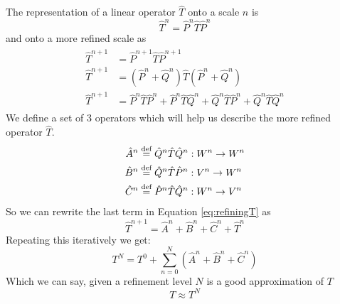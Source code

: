 \documentclass[../master_thesis.tex]{subfiles}
\begin{document}
The representation of a linear operator $\hat{T}$ onto a scale $n$ is
\begin{equation}\label{eq:PTP}
  \hat{T}^n = \hat{P}^n\hat{T}\hat{P}^n
\end{equation}
and onto a more refined scale as
\begin{align}\label{eq:refiningT}
  \begin{split}
    \hat{T}^{n+1} &= \hat{P}^{n+1}\hat{T}\hat{P}^{n+1}\\
    \hat{T}^{n+1} &= (\hat{P}^n + \hat{Q}^n)\hat{T}(\hat{P}^n + \hat{Q}^n)\\
    \hat{T}^{n+1} &= \hat{P}^n\hat{T}\hat{P}^n + \hat{P}^n\hat{T}\hat{Q}^n + \hat{Q}^n\hat{T}\hat{P}^n + \hat{Q}^n\hat{T}\hat{Q}^n
  \end{split}
\end{align}
We define a set of 3 operators which will help us describe the more refined operator
$\hat{T}$.
\begin{align}
  \hat{A}^n & \stackrel{\text{def}}{=}\hat{Q}^n\hat{T}\hat{Q}^n: W^n \to W^n\\
  \hat{B}^n & \stackrel{\text{def}}{=}\hat{Q}^n\hat{T}\hat{P}^n: V^n \to W^n\\
  \hat{C}^n & \stackrel{\text{def}}{=}\hat{P}^n\hat{T}\hat{Q}^n: W^n \to V^n
\end{align}
So we can rewrite the last term in Equation \ref{eq:refiningT} as
\begin{equation}\label{eq:refineT}
  \hat{T}^{n+1} =\hat{A}^n + \hat{B}^n + \hat{C}^n + \hat{T}^n
\end{equation}
Repeating this iteratively we get:
\begin{equation}\label{eq:}
  T^N = T^0 + \sum^N_{n=0}\left( \hat{A}^n + \hat{B}^n + \hat{C}^n\right)
\end{equation}
Which we can say, given a refinement level $N$ is a good approximation of $T$
\begin{equation}
  T \approx T^N
\end{equation}
\end{document}
